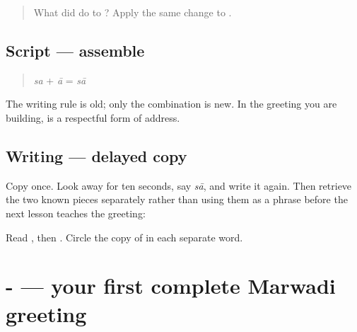\label{lesson:MW-W01-saa}



\begin{quote}
What did \textbf{} do to \textbf{}? Apply the same change to \textbf{}.
\end{quote}

\subsection*{Script — assemble}
\begin{quote}
\textbf{} \emph{sa} + \textbf{} \emph{ā} = \textbf{} \emph{sā}
\end{quote}

The writing rule is old; only the combination is new. In the greeting you are building, \textbf{} is a respectful form of address.

\subsection*{Writing — delayed copy}

Copy \textbf{} once. Look away for ten seconds, say \emph{sā}, and write it again. Then retrieve the two known pieces separately rather than using them as a phrase before the next lesson teaches the greeting:

\begin{quote}
\textbf{}
\end{quote}

\begin{quote}
\textbf{}
\end{quote}

\begin{tcolorbox}[breakable,colback=teal!4,colframe=teal!35!black,title={Before you move on}]
Read \textbf{}, then \textbf{}. Circle the copy of \textbf{} in each separate word.
\end{tcolorbox}
\section[\texorpdfstring{\mw{राम}-\mw{राम} \mw{सा} (rām-rām sā)}{राम-राम सा (rām-rām sā)}]{-  — your first complete Marwadi greeting}

\label{lesson:MW-C01-raam-raam-saa}



